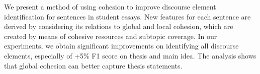 We present a method of using cohesion to improve discourse element identification for sentences in student essays. New features for each sentence are derived by considering its relations to global and local cohesion, which are created by means of cohesive resources and subtopic coverage. In our experiments, we obtain significant improvements on identifying all discourse elements, especially of +5\% F1 score on thesis and main idea. The analysis shows that global cohesion can better capture thesis statements.
